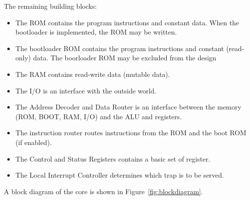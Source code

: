 \documentclass[12pt]{article}
\begin{document}
The remaining building blocks:
\begin{itemize}
\item The ROM contains the program instructions and constant data. When the bootloader is implemented, the ROM may be written.
\item The bootloader ROM contains the program instructions and constant (read-only) data. The boorloader ROM may be excluded from the design
\item The RAM contains read-write data (mutable data).
\item The I/O is an interface with the outside world.
\item The Address Decoder and Data Router is an interface between the memory (ROM, BOOT, RAM, I/O) and the ALU and registers.
\item The instruction router routes instructions from the ROM and the boot ROM (if enabled).
\item The Control and Status Registers contains a basic set of register.
\item The Local Interrupt Controller determines which trap is to be served.
\end{itemize}

A block diagram of the core is shown in Figure~\ref{fig:blockdiagram}.
\end{document}
